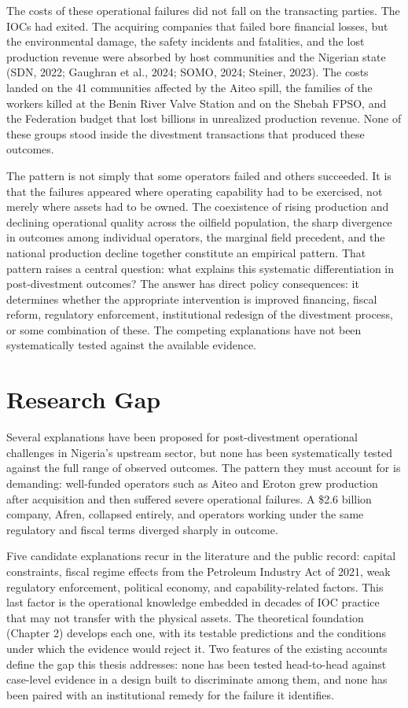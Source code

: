 \documentclass[twoside,fontset=lmodern]{mitthesis}
\begin{document}
The costs of these operational failures did not fall on the transacting
parties. The IOCs had exited. The acquiring companies that failed bore
financial losses, but the environmental damage, the safety incidents and
fatalities, and the lost production revenue were absorbed by host
communities and the Nigerian state (SDN, 2022; Gaughran et al., 2024;
SOMO, 2024; Steiner, 2023). The costs landed on the 41 communities
affected by the Aiteo spill, the families of the workers killed at the
Benin River Valve Station and on the Shebah FPSO, and the Federation
budget that lost billions in unrealized production revenue. None of
these groups stood inside the divestment transactions that produced
these outcomes.

The pattern is not simply that some operators failed and others
succeeded. It is that the failures appeared where operating capability
had to be exercised, not merely where assets had to be owned. The
coexistence of rising production and declining operational quality
across the oilfield population, the sharp divergence in outcomes among
individual operators, the marginal field precedent, and the national
production decline together constitute an empirical pattern. That
pattern raises a central question: what explains this systematic
differentiation in post-divestment outcomes? The answer has direct
policy consequences: it determines whether the appropriate intervention
is improved financing, fiscal reform, regulatory enforcement,
institutional redesign of the divestment process, or some combination of
these. The competing explanations have not been systematically tested
against the available evidence.

\hypertarget{research-gap}{%
\section{Research Gap}\label{research-gap}}

Several explanations have been proposed for post-divestment operational
challenges in Nigeria's upstream sector, but none has been
systematically tested against the full range of observed outcomes. The
pattern they must account for is demanding: well-funded operators such
as Aiteo and Eroton grew production after acquisition and then suffered
severe operational failures. A \$2.6 billion company, Afren, collapsed
entirely, and operators working under the same regulatory and fiscal
terms diverged sharply in outcome.

Five candidate explanations recur in the literature and the public
record: capital constraints, fiscal regime effects from the Petroleum
Industry Act of 2021, weak regulatory enforcement, political economy,
and capability-related factors. This last factor is the operational
knowledge embedded in decades of IOC practice that may not transfer with
the physical assets. The theoretical foundation (Chapter 2) develops
each one, with its testable predictions and the conditions under which
the evidence would reject it. Two features of the existing accounts
define the gap this thesis addresses: none has been tested head-to-head
against case-level evidence in a design built to discriminate among
them, and none has been paired with an institutional remedy for the
failure it identifies.
\end{document}
